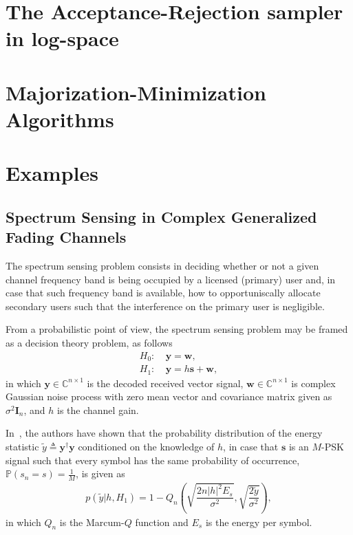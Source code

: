 \documentclass[conference, 10pt]{IEEEtran}
\begin{document}
\section{The Acceptance-Rejection sampler in log-space}

\section{Majorization-Minimization Algorithms}

\section{Examples}
\subsection{Spectrum Sensing in Complex Generalized Fading Channels}

The spectrum sensing problem consists in deciding whether or not a given channel
frequency band is being occupied by a licensed (primary) user and, in case that such
frequency band is available, how to opportuniscally allocate secondary users
such that the interference on the primary user is negligible.

From a probabilistic point of view, the spectrum sensing problem may be framed as
a decision theory problem, as follows
\begin{align}
    H_0:~& \bm{y} = \bm{w},\\
    H_1:~& \bm{y} = h\bm{s} + \bm{w},
\end{align}
in which $\bm{y} \in \mathbb{C}^{n\times 1}$ is the decoded received vector signal,
$\bm{w} \in \mathbb{C}^{n\times 1}$ is complex Gaussian noise process with zero mean
vector and covariance matrix given as $\sigma^2\bm{I}_n$, and $h$ is the channel gain.

In~\cite{cardoso2017}, the authors have shown that the probability distribution of the
energy statistic $\tilde{y} \triangleq \bm{y}^{\dagger}\bm{y}$ conditioned on the knowledge of $h$,
in case that $\bm{s}$ is an $M$-PSK signal such that every symbol has the same probability of occurrence,
$\mathbb{P}(s_n = s) = \frac{1}{M}$, is given as
\begin{align}
    p(\tilde{y} | h, H_1) = 1 - Q_{n}\left(\sqrt{\dfrac{2n|h|^2E_s}{\sigma^2}}, \sqrt{\dfrac{2\tilde{y}}{\sigma^2}}\right),
\end{align}
in which $Q_{n}$ is the Marcum-$Q$ function and $E_s$ is the energy per symbol.
\end{document}

